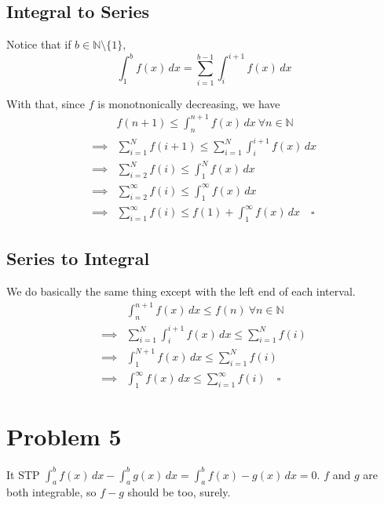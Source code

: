 \documentclass[12pt]{article}
\newcommand{\N}{\mathbb{N}}
\begin{document}
\subsection{Integral to Series}

Notice that if $b \in \N \setminus \{1\}$,
\[\int_{1}^{b} f(x)\,dx = \sum_{i=1}^{b-1} \int_{i}^{i+1} f(x)\,dx\]

With that, since $f$ is monotnonically decreasing, we have
\begin{align*}
             & f(n+1) \le \int_{n}^{n+1} f(x)\,dx\ \forall n \in \N                        \\
  \implies{} & \sum_{i=1}^{N} f(i+1) \le \sum_{i=1}^{N} \int_{i}^{i+1} f(x)\,dx            \\
  \implies{} & \sum_{i=2}^{N} f(i) \le \int_{1}^{N} f(x)\,dx                               \\
  \implies{} & \sum_{i=2}^{\infty} f(i) \le \int_{1}^{\infty} f(x)\,dx                     \\
  \implies{} & \sum_{i=1}^{\infty} f(i) \le f(1) + \int_{1}^{\infty} f(x)\,dx \quad\square
\end{align*}

\subsection{Series to Integral}

We do basically the same thing except with the left end of each interval.
\begin{align*}
             & \int_{n}^{n+1} f(x)\,dx \le f(n)\ \forall n \in \N                  \\
  \implies{} & \sum_{i=1}^{N} \int_{i}^{i+1} f(x)\,dx \le \sum_{i=1}^{N} f(i)      \\
  \implies{} & \int_{1}^{N+1} f(x)\,dx \le \sum_{i=1}^{N} f(i)                     \\
  \implies{} & \int_{1}^{\infty} f(x)\,dx \le \sum_{i=1}^{\infty} f(i)\quad\square
\end{align*}

\pagebreak

\section{Problem 5}

It STP $\int_{a}^{b} f(x) \,dx-\int_{a}^{b} g(x)\,dx=\int_{a}^{b} f(x)-g(x)\,dx=0$.
$f$ and $g$ are both integrable, so $f-g$ should be too, surely.
\end{document}
